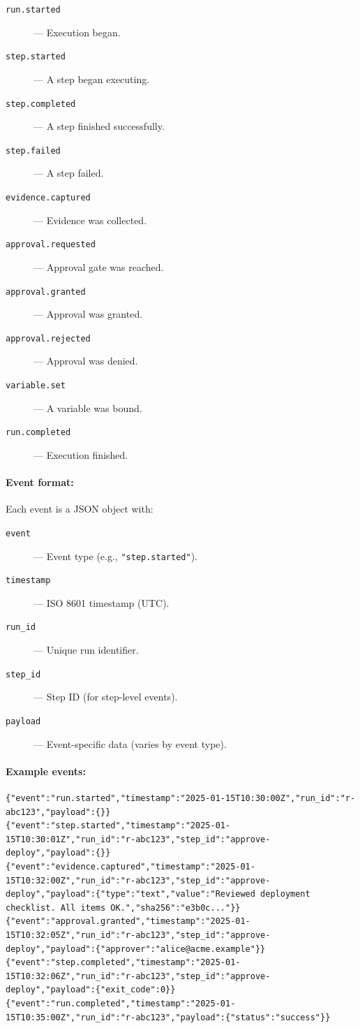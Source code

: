 \begin{description}
  \item[\texttt{run.started}] --- Execution began.
  \item[\texttt{step.started}] --- A step began executing.
  \item[\texttt{step.completed}] --- A step finished successfully.
  \item[\texttt{step.failed}] --- A step failed.
  \item[\texttt{evidence.captured}] --- Evidence was collected.
  \item[\texttt{approval.requested}] --- Approval gate was reached.
  \item[\texttt{approval.granted}] --- Approval was granted.
  \item[\texttt{approval.rejected}] --- Approval was denied.
  \item[\texttt{variable.set}] --- A variable was bound.
  \item[\texttt{run.completed}] --- Execution finished.
\end{description}

\paragraph{Event format:}

Each event is a JSON object with:

\begin{description}
  \item[\texttt{event}] --- Event type (e.g., \texttt{"step.started"}).
  \item[\texttt{timestamp}] --- ISO 8601 timestamp (UTC).
  \item[\texttt{run\_id}] --- Unique run identifier.
  \item[\texttt{step\_id}] --- Step ID (for step-level events).
  \item[\texttt{payload}] --- Event-specific data (varies by event type).
\end{description}

\paragraph{Example events:}

\begin{verbatim}
{"event":"run.started","timestamp":"2025-01-15T10:30:00Z","run_id":"r-abc123","payload":{}}
{"event":"step.started","timestamp":"2025-01-15T10:30:01Z","run_id":"r-abc123","step_id":"approve-deploy","payload":{}}
{"event":"evidence.captured","timestamp":"2025-01-15T10:32:00Z","run_id":"r-abc123","step_id":"approve-deploy","payload":{"type":"text","value":"Reviewed deployment checklist. All items OK.","sha256":"e3b0c..."}}
{"event":"approval.granted","timestamp":"2025-01-15T10:32:05Z","run_id":"r-abc123","step_id":"approve-deploy","payload":{"approver":"alice@acme.example"}}
{"event":"step.completed","timestamp":"2025-01-15T10:32:06Z","run_id":"r-abc123","step_id":"approve-deploy","payload":{"exit_code":0}}
{"event":"run.completed","timestamp":"2025-01-15T10:35:00Z","run_id":"r-abc123","payload":{"status":"success"}}
\end{verbatim}

